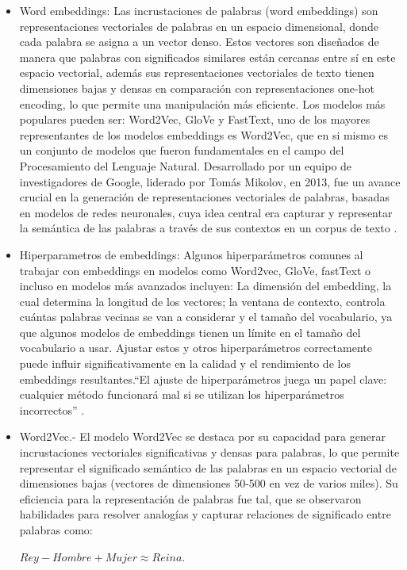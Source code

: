 \begin{itemize}

	\item Word embeddings: Las incrustaciones de palabras (word embeddings) son representaciones vectoriales de palabras en un espacio dimensional, donde cada palabra se asigna a un vector denso. Estos vectores son diseñados de manera que palabras con significados similares están cercanas entre sí en este espacio vectorial, además sus representaciones vectoriales de texto tienen dimensiones bajas y densas en comparación con representaciones one-hot encoding, lo que permite una manipulación más eficiente. Los modelos  más populares pueden ser: Word2Vec, GloVe y FastText, uno de los mayores representantes de los modelos embeddings es Word2Vec, que en si mismo es un conjunto de modelos que fueron fundamentales en el campo del Procesamiento del Lenguaje Natural. Desarrollado por un equipo de investigadores de Google, liderado por Tomás Mikolov, en 2013, fue un avance crucial en la generación de representaciones vectoriales de palabras, basadas en modelos de redes neuronales, cuya idea central era capturar y representar la semántica de las palabras a través de sus contextos en un corpus de texto \cite{mikolov2013efficient}. 
	\item Hiperparametros de embeddings: Algunos hiperparámetros comunes al trabajar con embeddings en modelos como Word2vec, GloVe, fastText o incluso en modelos más avanzados incluyen:  La dimensión del embedding, la cual  determina la longitud de los vectores; la ventana de contexto, controla cuántas palabras vecinas se van a considerar y el tamaño del vocabulario, ya que algunos modelos de embeddings tienen un límite en el tamaño del vocabulario a usar. Ajustar estos y otros  hiperparámetros correctamente puede influir significativamente en la calidad y el rendimiento de los embeddings resultantes.``El ajuste de hiperparámetros juega un papel clave: cualquier método funcionará mal si se utilizan los hiperparámetros incorrectos'' \cite[p. 339]{eisenstein2018natural}.
	
	\item Word2Vec.- El modelo Word2Vec se destaca por su capacidad para generar incrustaciones vectoriales significativas y densas para palabras, lo que permite representar el significado semántico de las palabras en un espacio vectorial de dimensiones bajas (vectores de dimensiones 50-500 en vez de varios miles). Su eficiencia para la representación de palabras fue tal, que se observaron habilidades para resolver analogías y capturar relaciones de significado entre palabras como:  
	\begin{Center}
			$Rey - Hombre + Mujer \approx  Reina$.
	\end{Center}


\end{itemize}
